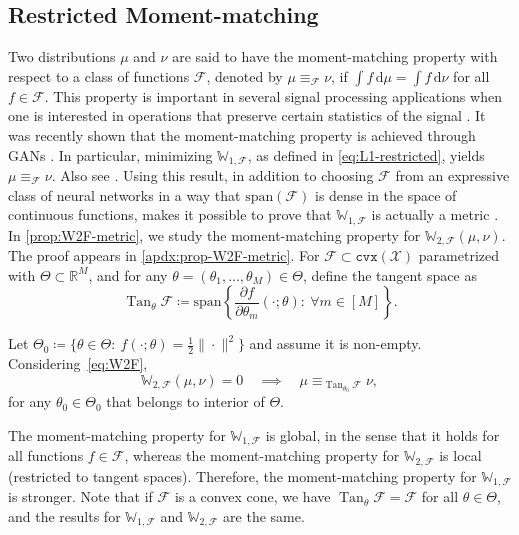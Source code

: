 \documentclass[10pt]{article}
\newcommand{\ud}{\,\mathrm{d}}
\newcommand{\op}[1]{\operatorname{#1}}
\newcommand{\norm}[1]{\|#1\|}
\newcommand{\Tan}{\op{Tan}}
\newcommand{\cvx}{\mathtt{cvx}}
\newcommand{\W}{\mathds{W}}
\newcommand{\calF}{\mathcal{F}}
\newcommand{\calX}{\mathcal{X}}
\numberwithin{equation}{section}
\begin{document}
\subsection{Restricted Moment-matching} \label{sec:moment-matching}
Two distributions $\mu$ and $\nu$ are said to have the moment-matching property with respect to a class of functions $\calF$, denoted by $\mu \equiv_\calF \nu$, if $\int f \ud \mu = \int f \ud \nu$ for all $f \in \calF$. This property is important in several signal processing applications when one is interested in operations that preserve certain statistics of the signal \citep{rabin2011removing,rabin2011wasserstein}. It was recently shown that the moment-matching property is achieved through GANs \citep{liu2017approximation,zhang2017discrimination}. In particular, minimizing $\W_{1,\calF}$, as defined in \eqref{eq:L1-restricted}, yields $\mu \equiv_\calF \nu$. Also see \citet{han2018local}. Using this result, in addition to choosing $\calF$ from an expressive class of neural networks in a way that $\text{span}(\calF)$ is dense in the space of continuous functions, makes it possible to prove that $\W_{1,\calF}$ is actually a metric \citep{liu2017approximation,zhang2017discrimination}. In \autoref{prop:W2F-metric}, we study the moment-matching property for $\W_{2,\calF}(\mu,\nu)$. The proof appears in \autoref{apdx:prop-W2F-metric}. For $\calF \subset \cvx(\calX)$ parametrized with $\Theta\subset \mathbb{R}^M$, and for any $\theta=(\theta_1,\ldots,\theta_M) \in \Theta$, define the tangent space as 
\begin{equation}\label{eq:Tan-space}
\Tan_\theta \calF\coloneqq \text{span}\left\{\frac{\partial f}{\partial \theta_m}(\cdot;\theta):~\forall m \in[M] \right\} .
\end{equation} 

\begin{theorem}\label{prop:W2F-metric}
	Let $\Theta_0\coloneqq\{\theta \in \Theta:~f(\cdot;\theta)=\frac{1}{2}\norm{\cdot}^2\}$ and assume it is non-empty. 
	Considering~\eqref{eq:W2F}, 
	\begin{equation*}%
	\W_{2,\calF}(\mu,\nu) =0 \quad \implies\quad\mu \equiv_{\Tan_{\theta_0}\calF} \nu,
	\end{equation*}
for any $\theta_0 \in \Theta_0$ that belongs to interior of $\Theta$.
\end{theorem}
The moment-matching property for $\W_{1,\calF}$ is global, in the sense that it holds for all functions $f \in \calF$, whereas the moment-matching property for $\W_{2,\calF}$ is local (restricted to tangent spaces). Therefore, the moment-matching property for $\W_{1,\calF}$ is stronger. Note that if $\calF$ is a convex cone, we have $\Tan_\theta \calF = \calF$ for all $\theta\in\Theta$, and the results for $\W_{1,\calF}$ and $\W_{2,\calF}$ are the same. 
\end{document}
